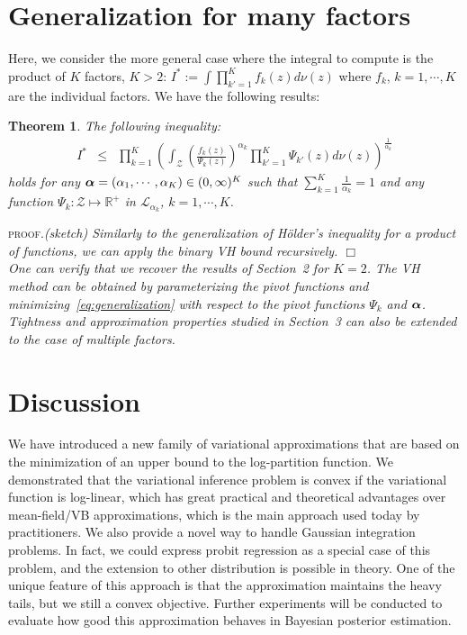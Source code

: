 \documentclass{article} %
\newcommand{\Holder}{H\"older\xspace}
\renewcommand{\t}{\mathbf{t}}
\newcommand{\Zspace}{\mathcal{Z}}
\newcommand{\I}{I}
\newcommand{\basem}{\nu}
\def\z{z}
\renewcommand{\Re}{\mathbb{R}}
\newenvironment{proof}{\textsc{proof.}\it}{\hfill{$\Box$}}
\newtheorem{theorem}{Theorem}
\begin{document}
\section{Generalization for many factors}
\label{many-factor}
Here, we consider the more general case where the integral to compute is the product of $K$ factors, $K>2$:
$\I^*:=\int \prod_{k'=1}^K f_k(\z) d\basem(\z)$ where $f_k$, $k=1,\cdots, K$ are the individual factors.
We have the following results:
\begin{theorem}
The following inequality:
\begin{eqnarray}
\label{eq:generalization}
I^*
&\le& 
\prod_{k=1}^K \left(
	\int_{\Zspace} {\left(\frac{f_k(\z)}{\Psi_k(\z)}\right)}^{\alpha_k} 
	\prod_{k'=1}^K \Psi_{k'}(\z) d\basem(\z)
	\right)^{\frac{1}{\alpha_k}}
\label{eq:Holder2}
\end{eqnarray}
holds for any ${\bm{\alpha}}=(\alpha_1,\cdots,\alpha_K)\in(0,\infty)^K$ such that $\sum_{k=1}^K \frac{1}{\alpha_k}=1$
and any function $\Psi_k:\Zspace\mapsto\Re^+$ in $\mathcal{L}_{\alpha_k}$, $k=1,\cdots, K$.
\end{theorem}
\begin{proof}(sketch)
Similarly to the generalization of \Holder's inequality for a product of functions, we can apply the binary VH bound recursively.
\end{proof}\\
One can verify that we recover the results of Section~2 for $K=2$. 
The VH method can be obtained by parameterizing the pivot functions and minimizing~\eqref{eq:generalization}  with respect
to the pivot functions $\Psi_k$ and ${\bm{\alpha}}$.
Tightness and approximation properties studied in Section~3
can also be extended to the case of multiple factors.


\section{Discussion}
We have introduced a new family of variational approximations that are based on the 
minimization of an upper bound to the log-partition function. We demonstrated that
the variational inference problem is convex if the variational function is log-linear, 
which has great practical and theoretical advantages over mean-field/VB approximations,
which is the main approach used today by practitioners. We also provide a novel way to
handle Gaussian integration problems. In fact, we could express probit regression as a special case of this problem, and the extension to other distribution is possible in theory. One of the unique feature of this approach is that
the approximation maintains the heavy tails, but we still
a convex objective. Further experiments will be conducted to evaluate how good this 
approximation behaves in Bayesian posterior estimation. 
\end{document}
